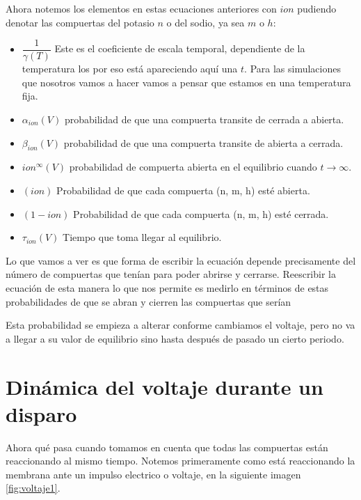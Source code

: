 Ahora notemos los elementos en estas ecuaciones anteriores con \(ion\) pudiendo denotar las compuertas del potasio \(n\) o del sodio, ya sea \(m\) o \(h\):
\begin{itemize}
 \item \(\dfrac{1}{\gamma(T)}\) Este es el coeficiente de escala temporal, dependiente de la temperatura los por eso está apareciendo aquí una \(t\). Para las simulaciones que nosotros vamos a hacer vamos a pensar que estamos en una temperatura fija. 
 \item \(\alpha_{ion}(V)\) probabilidad de que una compuerta transite de cerrada a abierta.
 \item \(\beta_{ion}(V)\) probabilidad de que una compuerta transite de abierta a cerrada.
 \item \(ion^\infty(V)\) probabilidad de compuerta abierta en el equilibrio cuando \(t \rightarrow \infty\).
 \item \((ion)\) Probabilidad de que cada compuerta (n, m, h) esté abierta.
 \item \((1-ion)\) Probabilidad de que cada compuerta (n, m, h) esté cerrada.
 
 \item \(\tau_{ion}(V)\) Tiempo que toma llegar al equilibrio.
\end{itemize}


Lo que vamos a ver es que forma de escribir la ecuación depende precisamente del número de compuertas que tenían para poder abrirse y cerrarse. Reescribir la ecuación de esta manera lo que nos permite es medirlo en términos de estas probabilidades de que se abran y cierren las compuertas que serían 

Esta probabilidad se empieza a alterar conforme cambiamos el voltaje, pero no va a llegar a su valor de equilibrio sino hasta después de pasado un cierto periodo.


\section{Dinámica del voltaje durante un disparo} 

Ahora qué pasa cuando tomamos en cuenta que todas las compuertas están reaccionando al mismo tiempo.
Notemos primeramente como está reaccionando la membrana ante un impulso electrico o voltaje, en la siguiente imagen \ref{fig:voltaje1}.

